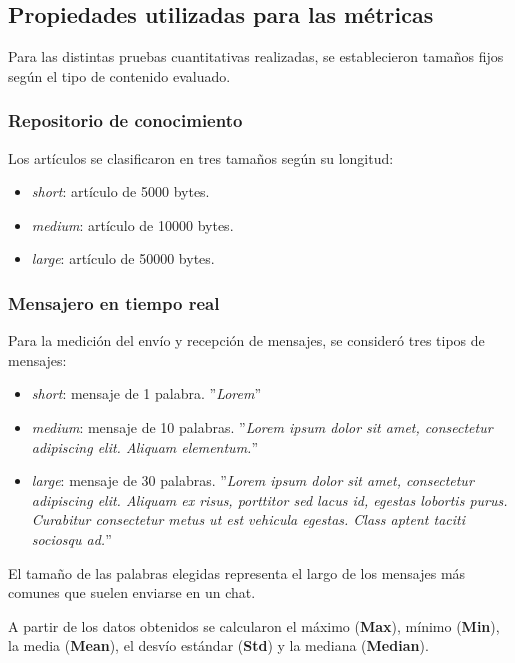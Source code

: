 \subsection{Propiedades utilizadas para las métricas}

Para las distintas pruebas cuantitativas realizadas, se establecieron tamaños fijos según el tipo de contenido evaluado.

\subsubsection{Repositorio de conocimiento}

Los artículos se clasificaron en tres tamaños según su longitud:

\begin{itemize}
    \item \textit{short}: artículo de 5000 bytes.
    \item \textit{medium}: artículo de 10000 bytes.
    \item \textit{large}: artículo de 50000 bytes.
\end{itemize}

\subsubsection{Mensajero en tiempo real}

Para la medición del envío y recepción de mensajes, se consideró tres tipos de mensajes:

\begin{itemize}
    \item \textit{short}: mensaje de 1 palabra. ''\textit{Lorem}''
    \item \textit{medium}: mensaje de 10 palabras. ''\textit{Lorem ipsum dolor sit amet, consectetur adipiscing elit. Aliquam elementum.}''
    \item \textit{large}: mensaje de 30 palabras. ''\textit{Lorem ipsum dolor sit amet, consectetur adipiscing elit. Aliquam ex risus, porttitor sed lacus id, egestas lobortis purus. Curabitur consectetur metus ut est vehicula egestas. Class aptent taciti sociosqu ad.}''
\end{itemize}

El tamaño de las palabras elegidas representa el largo de los mensajes más comunes que suelen enviarse en un chat.

A partir de los datos obtenidos se calcularon el máximo (\textbf{Max}), mínimo (\textbf{Min}), la media (\textbf{Mean}), el desvío estándar (\textbf{Std}) y la mediana (\textbf{Median}).